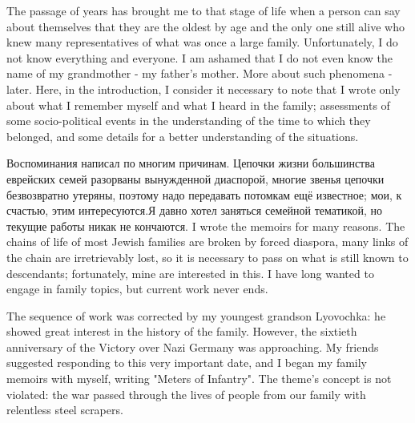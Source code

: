 {
The passage of years has brought me to that stage of life
when a person can say about themselves that they are the oldest by age and the only one still
alive who knew many representatives of what was once a large family. Unfortunately, I do not know everything and everyone. I am ashamed that I do not even know the name
of my grandmother - my father's mother. More about such phenomena - later. Here, in the introduction, I consider it necessary to note
that I wrote only about what I remember myself and what I heard in the family; assessments of some socio-political events in the understanding
of the time to which they belonged, and some details
for a better understanding of the situations.}

\par
\noindent

\translate
{Воспоминания написал по многим причинам. Цепочки жизни большинства еврейских семей разорваны вынужденной диаспорой, многие звенья цепочки безвозвратно утеряны, поэтому надо передавать потомкам ещё известное; мои, к счастью, этим интересуются.Я давно хотел заняться семейной тематикой, но текущие работы никак не кончаются.}
{I wrote the memoirs for many reasons. The chains of life of most Jewish families are broken by forced diaspora, many links of the chain are irretrievably lost, so it is necessary to pass on what is still known to descendants; fortunately, mine are interested in this. I have long wanted to engage in family topics, but current work never ends.}

\par

{
The sequence of work was corrected by my youngest grandson Lyovochka: he showed great interest in the history of the family. However, the sixtieth anniversary of the Victory over Nazi Germany was approaching. My friends suggested responding to this very important date, and I began my family memoirs with myself, writing "Meters of Infantry". The theme's concept is not violated: the war passed through the lives of people from our family with relentless steel scrapers.}
